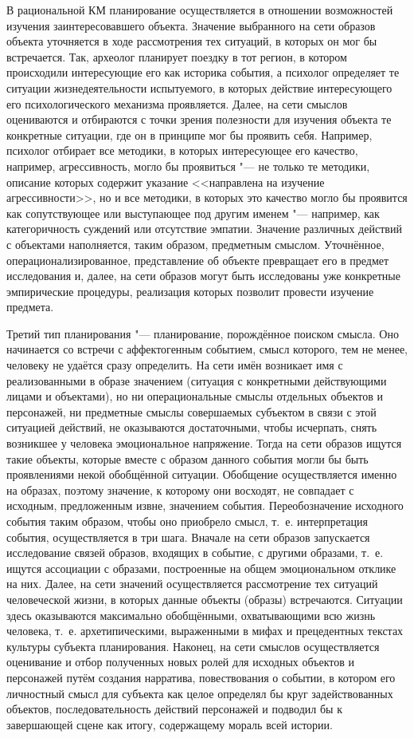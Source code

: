 \documentclass[a4paper, 12pt]{article}
\theoremstyle{plain}
\begin{document}
	В рациональной КМ планирование осуществляется в отношении возможностей изучения заинтересовавшего объекта. Значение выбранного на сети образов объекта уточняется в ходе рассмотрения тех ситуаций, в которых он мог бы встречается. Так, археолог планирует поездку в тот регион, в котором происходили интересующие его как историка события, а психолог определяет те ситуации жизнедеятельности испытуемого, в которых действие интересующего его психологического механизма проявляется. Далее, на сети смыслов оцениваются и отбираются с точки зрения полезности для изучения объекта те конкретные ситуации, где он в принципе мог бы проявить себя. Например, психолог отбирает все методики, в которых интересующее его качество, например, агрессивность, могло бы проявиться "--- не только те методики, описание которых содержит указание <<направлена на изучение агрессивности>>, но и все методики, в которых это качество могло бы проявится как сопутствующее или выступающее под другим именем "--- например, как категоричность суждений или отсутствие эмпатии. Значение различных действий с объектами наполняется, таким образом, предметным смыслом. Уточнённое, операционализированное, представление об объекте превращает его в предмет исследования и, далее, на сети образов могут быть исследованы уже конкретные эмпирические процедуры, реализация которых позволит провести изучение предмета.
	
	Третий тип планирования "--- планирование, порождённое поиском смысла. Оно начинается со встречи с аффектогенным событием, смысл которого, тем не менее, человеку не удаётся сразу определить. На сети имён возникает имя с реализованными в образе значением (ситуация с конкретными действующими лицами и объектами), но ни операциональные смыслы отдельных объектов и персонажей, ни предметные смыслы совершаемых субъектом в связи с этой ситуацией действий, не оказываются достаточными, чтобы исчерпать, снять возникшее у человека эмоциональное напряжение. Тогда на сети образов ищутся такие объекты, которые вместе с образом данного события могли бы быть проявлениями некой обобщённой ситуации. Обобщение осуществляется именно на образах, поэтому значение, к которому они восходят, не совпадает с исходным, предложенным извне, значением события. Переобозначение исходного события таким образом, чтобы оно приобрело смысл, т.~е. интерпретация события, осуществляется в три шага. Вначале на сети образов запускается исследование связей образов, входящих в событие, с другими образами, т.~е. ищутся ассоциации с образами, построенные на общем эмоциональном отклике на них. Далее, на сети значений осуществляется рассмотрение тех ситуаций человеческой жизни, в которых данные объекты (образы) встречаются. Ситуации здесь оказываются максимально обобщёнными, охватывающими всю жизнь человека, т.~е. архетипическими, выраженными в мифах и прецедентных текстах культуры субъекта планирования. Наконец, на сети смыслов осуществляется оценивание и отбор полученных новых ролей для исходных объектов и персонажей путём создания нарратива, повествования о событии, в котором его личностный смысл для субъекта как целое определял бы круг задействованных объектов, последовательность действий персонажей и подводил бы к завершающей сцене как итогу, содержащему мораль всей истории.
\end{document}
